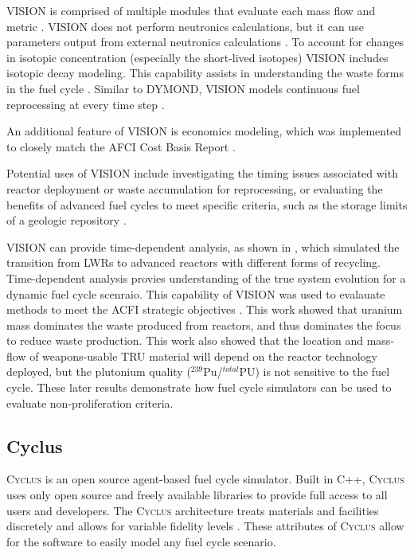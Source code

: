 \documentclass{article}
\newcommand{\Cyclus}{\textsc{Cyclus}\xspace}%
\begin{document}
    VISION is comprised of multiple modules that evaluate each mass flow and 
    metric \cite{yacout_visionverifiable_2006}. \gls{VISION} does not perform
    neutronics calculations, but it can use parameters output from external 
    neutronics calculations \cite{yacout_visionverifiable_2006}. To account 
    for changes in isotopic concentration (especially the short-lived 
    isotopes) \gls{VISION} includes isotopic decay modeling. This capability 
    assists in 
    understanding the waste forms in the fuel cycle \cite{yacout_visionverifiable_2006}.
    Similar to \gls{DYMOND}, \gls{VISION} models continuous fuel reprocessing at 
    every time step \cite{feng_standardized_2016}. 

    An additional feature of \gls{VISION} is economics modeling, which was 
    implemented to closely match the AFCI Cost Basis 
    Report \cite{yacout_visionverifiable_2006}. 

    Potential uses of \gls{VISION} include investigating the timing issues 
    associated with reactor deployment or waste accumulation for reprocessing, 
    or evaluating the benefits of advanced fuel cycles to meet specific 
    criteria, such as the storage limits of a geologic repository 
    \cite{yacout_visionverifiable_2006}. 

    \gls{VISION} can provide time-dependent analysis, as shown in \cite{piet_dynamic_2011}, 
    which simulated the transition from LWRs to advanced reactors with different 
    forms of recycling. Time-dependent analysis provies understanding of the 
    true system evolution for a dynamic fuel cycle scenraio. This capability of 
    \gls{VISION} was used to evalauate methods to meet the ACFI strategic 
    objectives \cite{piet_dynamic_2011}. This work showed that uranium mass 
    dominates the waste produced from reactors, and thus dominates the focus
    to reduce waste production. This work also showed that the location and 
    mass-flow of weapons-usable \gls{TRU} material will depend on the 
    reactor technology deployed, but the plutonium quality 
    ($^{239}$Pu/$^{total}$PU) is not sensitive to the fuel cycle. These later
    results demonstrate how fuel cycle simulators can be used to evaluate 
    non-proliferation criteria. 


    



    \subsection{Cyclus}
    \Cyclus is an open source agent-based fuel cycle simulator. Built 
    in C++, \Cyclus uses only open source and freely available libraries to 
    provide full access to all users and developers. The 
    \Cyclus architecture treats materials and facilities discretely and allows 
    for variable fidelity levels \cite{huff_fundamental_2016}. These attributes
    of \Cyclus allow for the software to easily model any fuel cycle scenario.
\end{document}
